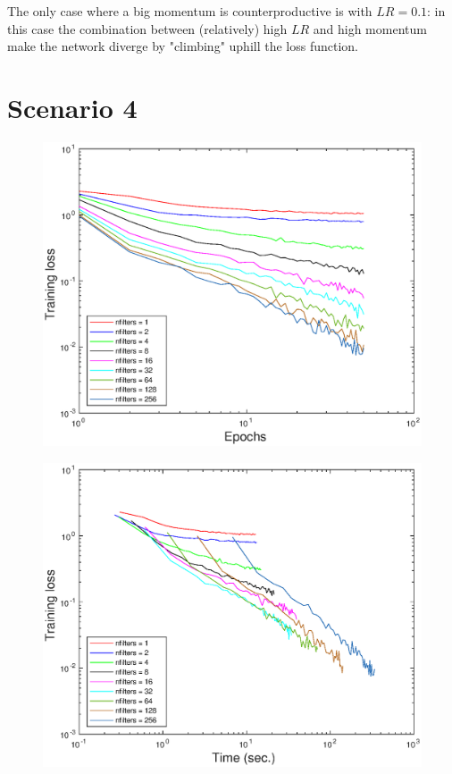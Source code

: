 \documentclass{article}
\begin{document}
    The only case where a big momentum is counterproductive is with $LR = 0.1$: in this case the combination between (relatively) high $LR$ and high momentum make the network diverge by "climbing" uphill the loss function.
    
    
    
    
\section*{Scenario 4}
	\begin{figure}[!htb]
        \centering
        \includegraphics[width=\textwidth]{figures/sc4_tr_loss}
    \end{figure}
    \begin{figure}[!htb]
        \centering
        \includegraphics[width=\textwidth]{figures/sc4_tr_loss_time}
    \end{figure}
\end{document}
